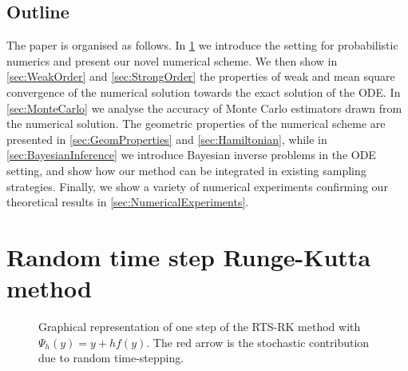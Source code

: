 \documentclass[final,onefignum,onetabnum]{siamonline171218}
\begin{document}
\subsection{Outline} The paper is organised as follows. In \cref{sec:MethodIntro} we introduce the setting for probabilistic numerics and present our novel numerical scheme. We then show in \cref{sec:WeakOrder} and \cref{sec:StrongOrder} the properties of weak and mean square convergence of the numerical solution towards the exact solution of the ODE. In \cref{sec:MonteCarlo} we analyse the accuracy of Monte Carlo estimators drawn from the numerical solution. The geometric properties of the numerical scheme are presented in \cref{sec:GeomProperties} and \cref{sec:Hamiltonian}, while in \cref{sec:BayesianInference} we introduce Bayesian inverse problems in the ODE setting, and show how our method can be integrated in existing sampling strategies. Finally, we show a variety of numerical experiments confirming our theoretical results in \cref{sec:NumericalExperiments}.


\section{Random time step Runge-Kutta method}\label{sec:MethodIntro}

\begin{figure}
\centering
{}
\caption{Graphical representation of one step of the RTS-RK method with $\Psi_h(y) = y + hf(y)$. The red arrow is the stochastic contribution due to random time-stepping.}
\label{fig:GraphRandomStep}
\end{figure}
\end{document}
